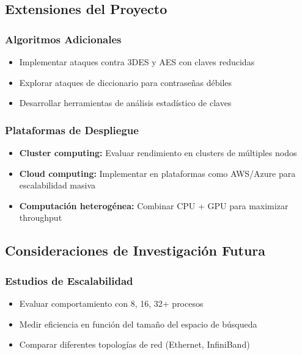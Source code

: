 \documentclass[12pt,letterpaper]{article}
\begin{document}
\subsection{Extensiones del Proyecto}

\subsubsection{Algoritmos Adicionales}

\begin{itemize}
    \item Implementar ataques contra 3DES y AES con claves reducidas
    \item Explorar ataques de diccionario para contraseñas débiles
    \item Desarrollar herramientas de análisis estadístico de claves
\end{itemize}

\subsubsection{Plataformas de Despliegue}

\begin{itemize}
    \item \textbf{Cluster computing:} Evaluar rendimiento en clusters de múltiples nodos
    \item \textbf{Cloud computing:} Implementar en plataformas como AWS/Azure para escalabilidad masiva
    \item \textbf{Computación heterogénea:} Combinar CPU + GPU para maximizar throughput
\end{itemize}

\subsection{Consideraciones de Investigación Futura}

\subsubsection{Estudios de Escalabilidad}

\begin{itemize}
    \item Evaluar comportamiento con 8, 16, 32+ procesos
    \item Medir eficiencia en función del tamaño del espacio de búsqueda
    \item Comparar diferentes topologías de red (Ethernet, InfiniBand)
\end{itemize}
\end{document}
